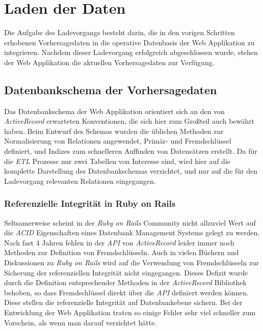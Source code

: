 \section{Laden der Daten}
Die Aufgabe des Ladevorgangs besteht darin, die in den vorigen
Schritten erhobenen Vorhersagedaten in die operative Datenbasis der
Web Applikation zu integrieren. Nachdem dieser Ladevorgang erfolgreich
abgeschlossen wurde, stehen der Web Applikation die aktuellen
Vorhersagedaten zur Verfügung. 

\subsection{Datenbankschema der Vorhersagedaten}
Das Datenbankschema der Web Applikation orientiert sich an den von
\textit{ActiveRecord} erwarteten Konventionen, die sich hier zum
Großteil auch bewährt haben. Beim Entwurf des Schemas wurden die
üblichen Methoden zur Normalisierung von Relationen angewendet,
Primär- und Fremdschlüssel definiert, und Indizes zum schnelleren
Auffinden von Datensätzen erstellt. Da für die \textit{ETL} Prozesse
nur zwei Tabellen von Interesse sind, wird hier auf die komplette
Darstellung des Datenbankschemas verzichtet, und nur auf die für den
Ladevorgang relevanten Relationen eingegangen.

\subsubsection{Referenzielle Integrität in Ruby on Rails}
Seltsamerweise scheint in der \textit{Ruby on Rails} Community nicht
allzuviel Wert auf die \textit{ACID}  Eigenschaften eines Datenbank
Management Systems gelegt zu werden. Nach fast 4 Jahren fehlen in der
\textit{API} von \textit{ActiveRecord} leider immer noch Methoden zur
Definition von Fremdschlüsseln. Auch in vielen Büchern und
Diskussionen zu \textit{Ruby on Rails} wird auf die Verwendung von
Fremdschlüsseln zur Sicherung der referenziellen Integrität nicht
eingegangen. Dieses Defizit wurde durch die Definition entsprechender
Methoden in der \textit{ActiveRecord} Bibliothek behoben, so dass
Fremdschlüssel direkt über die \textit{API} definiert werden
können. Diese stellen die referenzielle Integrität auf Datenbankebene
sichern. Bei der Entwicklung der Web Applikation traten so einige
Fehler sehr viel schneller zum Vorschein, als wenn man darauf
verzichtet hätte.

